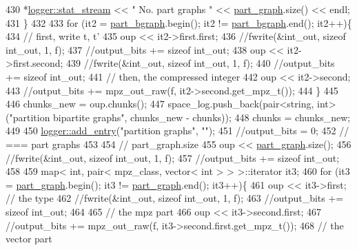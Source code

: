 \begin{DoxyCode}
430     *\hyperlink{classlogger_a7db37821f875f2ba3540980b355779f5}{logger::stat\_stream} << \textcolor{stringliteral}{" No. part graphs   "} << 
      \hyperlink{classmarked__graph__compressed_ae179a4737e6eab905c18a94d44ef64b7}{part\_graph}.size() << endl;
431   \}
432 
433   \textcolor{keywordflow}{for} (it2 = \hyperlink{classmarked__graph__compressed_a7b3267063fba30b45eb21b3ba4e07536}{part\_bgraph}.begin(); it2 != \hyperlink{classmarked__graph__compressed_a7b3267063fba30b45eb21b3ba4e07536}{part\_bgraph}.end(); it2++)\{
434     \textcolor{comment}{// first, write t, t'}
435     oup << it2->first.first;
436     \textcolor{comment}{//fwrite(&int\_out, sizeof int\_out, 1, f);}
437     \textcolor{comment}{//output\_bits += sizeof int\_out;}
438     oup <<  it2->first.second;
439     \textcolor{comment}{//fwrite(&int\_out, sizeof int\_out, 1, f);}
440     \textcolor{comment}{//output\_bits += sizeof int\_out;}
441     \textcolor{comment}{// then, the compressed integer}
442     oup << it2->second;
443     \textcolor{comment}{//output\_bits += mpz\_out\_raw(f, it2->second.get\_mpz\_t());}
444   \}
445 
446   chunks\_new = oup.chunks();
447   space\_log.push\_back(pair<string, int> (\textcolor{stringliteral}{"partition bipartite graphs"}, chunks\_new - chunks));
448   chunks = chunks\_new;
449 
450   \hyperlink{classlogger_a710163deb17bc81f70d53d285b8ac9ac}{logger::add\_entry}(\textcolor{stringliteral}{"partition graphs"}, \textcolor{stringliteral}{""});
451   \textcolor{comment}{//output\_bits = 0;}
452   \textcolor{comment}{// === part graphs}
453 
454   \textcolor{comment}{// part\_graph.size}
455   oup <<  \hyperlink{classmarked__graph__compressed_ae179a4737e6eab905c18a94d44ef64b7}{part\_graph}.size();
456   \textcolor{comment}{//fwrite(&int\_out, sizeof int\_out, 1, f);}
457   \textcolor{comment}{//output\_bits += sizeof int\_out;}
458 
459   map< int, pair< mpz\_class, vector< int > > >::iterator it3;
460   \textcolor{keywordflow}{for} (it3 = \hyperlink{classmarked__graph__compressed_ae179a4737e6eab905c18a94d44ef64b7}{part\_graph}.begin(); it3 != \hyperlink{classmarked__graph__compressed_ae179a4737e6eab905c18a94d44ef64b7}{part\_graph}.end(); it3++)\{
461     oup <<  it3->first; \textcolor{comment}{// the type}
462     \textcolor{comment}{//fwrite(&int\_out, sizeof int\_out, 1, f);}
463     \textcolor{comment}{//output\_bits += sizeof int\_out;}
464 
465     \textcolor{comment}{// the mpz part}
466     oup << it3->second.first;
467     \textcolor{comment}{//output\_bits += mpz\_out\_raw(f, it3->second.first.get\_mpz\_t());}
468     \textcolor{comment}{// the vector part}

\end{DoxyCode}
